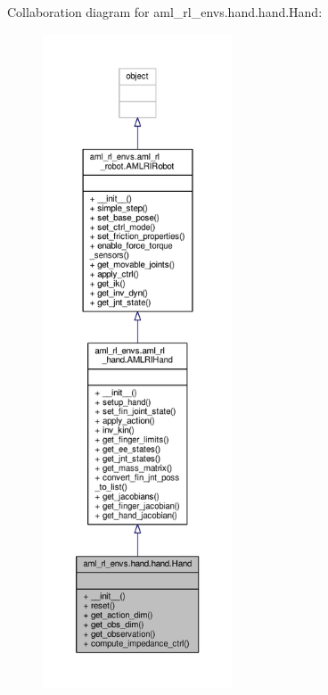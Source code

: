 Collaboration diagram for aml\-\_\-rl\-\_\-envs.\-hand.\-hand.\-Hand\-:
\nopagebreak
\begin{figure}[H]
\begin{center}
\leavevmode
\includegraphics[height=550pt]{classaml__rl__envs_1_1hand_1_1hand_1_1_hand__coll__graph}
\end{center}
\end{figure}
